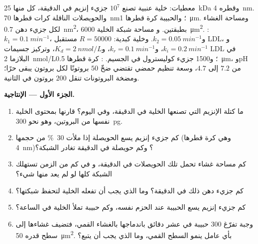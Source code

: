 \begin{problem}
\label{pb:b3:membrane-traffic:1}
معطيات: خلية عنبية تصنع $10^{7}$ جزيء إنزيم في الدقيقة، كل منها
\qty{25}{kDa} وقطره \qty{4}{nm}. والحويصلات الناقلة كرات قطرها
\qty{70}{nm}؛ والحبيبة كرة قطرها \qty{1}{\micro m}.
ومساحة الغشاء لكل جزيء دهن \qty{0.7}{nm^2}، بطبقتين. و
مساحة شبكة الخلية \qty{6000}{\micro m^2}. :
$k_{1} = \qty{0.1}{min^{-1}}$، و$k_{2} = \qty{0.05}{min^{-1}}$. وخلية
كبدية: $R = \num{50000}$ مستقبل LDL، و$k_{i} = \qty{0.2}{min^{-1}}$،
و$k_{r} = \qty{0.1}{min^{-1}}$، و$K_{d} = \qty{2}{nmol/L}$، وتركيز جسيمات
LDL في البلازما \qty{2}{nmol/L}؛ و\num{1500} جزيء كوليسترول
في الجسيم.
: كرة قطرها \qty{0.5}{\micro m}، وpH من $7.2$ إلى $4.7$،
وسعة تنظيم حمضي تقتضي ضخّ $50$ بروتونًا لكل بروتون
يبقى حرًا؛ ومضخة البروتونات تنقل $200$ بروتون في الثانية.

\medskip
\noindent\textbf{الجزء الأول --- الإنتاجية.}
\begin{enumerate}
  \item ما كتلة الإنزيم التي تصنعها الخلية في الدقيقة، وفي اليوم؟
        قارنها بمحتوى الخلية نفسها من البروتين، وهو نحو
        \qty{300}{pg}.
  \item كم جزيء إنزيم يسع الحويصلة إذا ملأت
        \qty{30}{\%} من حجمها (وهي كرة قطرها \qty{4}{nm})؟ وكم
        حويصلة في الدقيقة تغادر الشبكة؟
  \item كم مساحة غشاء تحمل تلك الحويصلات في الدقيقة، و
        في كم من الزمن تستهلك الشبكة كلها لو لم يعد
        منها شيء؟
  \item كم جزيء دهن ذلك في الدقيقة؟ وما الذي يجب أن
        تفعله الخلية لتحفظ شبكتها؟
  \item كم جزيء إنزيم يسع الحبيبة عند الحزم نفسه،
        وكم حبيبة تملأ الخلية في الساعة؟
  \item وجبة تفرّغ $300$ حبيبة في عشر دقائق باندماجها
        بالغشاء القمي، فتضيف غشاءها إلى سطح قدره
        \qty{50}{\micro m^2}. بأي عامل ينمو السطح القمي،
        وما الذي يجب أن يتبع؟
\end{enumerate}


\end{problem}
